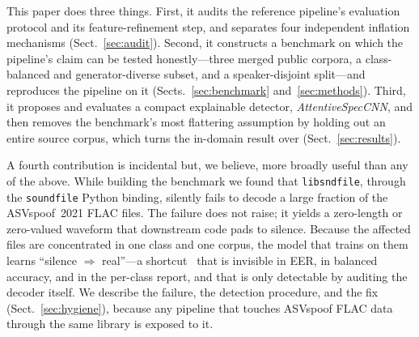 \documentclass[sn-mathphys-num,pdflatex]{sn-jnl}
\begin{document}
This paper does three things. First, it audits the reference
pipeline's evaluation protocol and its feature-refinement step, and separates
four independent inflation mechanisms
(Sect.~\ref{sec:audit}). Second, it constructs a benchmark on which the
pipeline's claim can be tested honestly---three merged public corpora, a
class-balanced and generator-diverse subset, and a speaker-disjoint split---and
reproduces the pipeline on it (Sects.~\ref{sec:benchmark}
and~\ref{sec:methods}). Third, it proposes and evaluates a compact explainable
detector, \emph{AttentiveSpecCNN}, and then removes the benchmark's most
flattering assumption by holding out an entire source corpus, which turns the
in-domain result over (Sect.~\ref{sec:results}).

A fourth contribution is incidental but, we believe, more broadly useful than
any of the above. While building the benchmark we found that
\texttt{libsndfile}, through the \texttt{soundfile} Python binding, silently
fails to decode a large fraction of the ASVspoof~2021 FLAC files. The failure
does not raise; it yields a zero-length or zero-valued waveform that downstream
code pads to silence. Because the affected files are concentrated in one class
and one corpus, the model that trains on them learns
``silence $\Rightarrow$ real''---a shortcut~\cite{shortcut} that is
invisible in EER, in balanced accuracy, and in the per-class report, and that is
only detectable by auditing the decoder itself. We describe the failure, the
detection procedure, and the fix (Sect.~\ref{sec:hygiene}), because any pipeline
that touches ASVspoof FLAC data through the same library is exposed to it.
\end{document}
